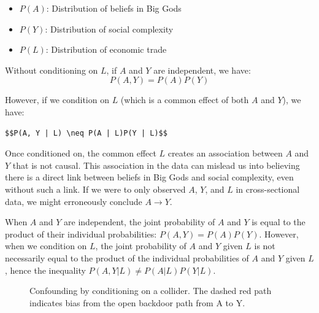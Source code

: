 \documentclass[
  singlecolumn,
  9pt]{article}
\providecommand{\tightlist}{%
  \setlength{\itemsep}{0pt}\setlength{\parskip}{0pt}}\usepackage{longtable,booktabs,array}
\begin{document}
\begin{itemize}
\tightlist
\item
  \(P(A)\): Distribution of beliefs in Big Gods
\item
  \(P(Y)\): Distribution of social complexity
\item
  \(P(L)\): Distribution of economic trade
\end{itemize}

Without conditioning on \(L\), if \(A\) and \(Y\) are independent, we
have: \[P(A, Y) = P(A)P(Y)\]

However, if we condition on \(L\) (which is a common effect of both
\(A\) and \(Y\)), we have:

\begin{verbatim}
$$P(A, Y | L) \neq P(A | L)P(Y | L)$$
\end{verbatim}

Once conditioned on, the common effect \(L\) creates an association
between \(A\) and \(Y\) that is not causal. This association in the data
can mislead us into believing there is a direct link between beliefs in
Big Gods and social complexity, even without such a link. If we were to
only observed \(A\), \(Y\), and \(L\) in cross-sectional data, we might
erroneously conclude \(A \to Y\).

When \(A\) and \(Y\) are independent, the joint probability of \(A\) and
\(Y\) is equal to the product of their individual probabilities:
\(P(A, Y) = P(A)P(Y)\). However, when we condition on \(L\), the joint
probability of \(A\) and \(Y\) given \(L\) is not necessarily equal to
the product of the individual probabilities of \(A\) and \(Y\) given
\(L\), hence the inequality \(P(A, Y | L) \neq P(A | L)P(Y | L)\).

\begin{figure}


\caption{\label{fig-dag-common-effect}Confounding by conditioning on a
collider. The dashed red path indicates bias from the open backdoor path
from A to Y.}

\end{figure}%
\end{document}

